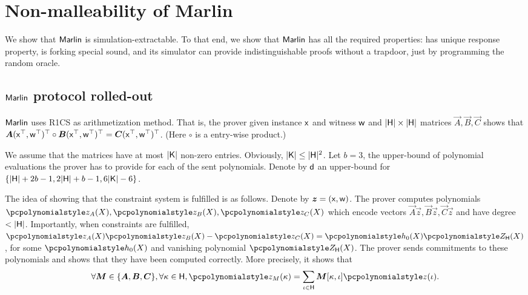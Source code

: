 
\section{Non-malleability of Marlin}
We show that ${\textnormal{\textsf{Marlin}}}$ is simulation-extractable. To that end, we show
that ${\textnormal{\textsf{Marlin}}}$ has all the required properties: has unique response property, is
forking special sound, and its simulator can provide indistinguishable proofs
without a trapdoor, just by programming the random oracle.

\subsection{${\textnormal{\textsf{Marlin}}}$ protocol rolled-out}
${\textnormal{\textsf{Marlin}}}$ uses R1CS as arithmetization method. That is, the prover given
instance $\mathsf{x}$ and witness $\mathsf{w}$ and $|\mathsf{H}| \times |\mathsf{H}|$ matrices $\vec{A},
\vec{B}, \vec{C}$ shows that $\vec{A} (\inp^\top, \wit^\top)^\top \circ \vec{B}
(\inp^\top, \wit^\top)^\top = \vec{C} (\inp^\top, \wit^\top)^\top$. (Here
$\circ$ is a entry-wise product.)

We assume that the matrices have at most $|\mathsf{K}|$ non-zero entries. Obviously,
$|\mathsf{K}| \leq |\mathsf{H}|^2$. Let $b = 3$, the upper-bound of polynomial evaluations
the prover has to provide for each of the sent polynomials.  Denote by $\mathsf{d}$
an upper-bound for $\{|\mathsf{H}| + 2b -1, 2 |\mathsf{H}| + b - 1, 6 |\mathsf{K}| - 6\}$.

The idea of showing that the constraint system is fulfilled is as
follows. Denote by $\vec{z} = (\inp, \wit)$. The prover computes polynomials
$\p{z_A} (X), \p{z_B} (X), \p{z_C} (X)$ which encode vectors
$\vec{A} \vec{z}, \vec{B} \vec{z}, \vec{C} \vec{z}$ and have degree $<
|\mathsf{H}|$. Importantly, when constraints are fulfilled,
$ \p{z_A} (X) \p{z_B} (X) - \p{z_C} (X) = \p{h_0} (X) \ZERO_\HHH (X)$, for some
$\p{h_0} (X)$ and vanishing polynomial $\ZERO_\HHH (X)$. The prover sends
commitments to these polynomials and shows that they have been computed
correctly. More precisely, it shows that
\begin{equation}
  \label{eq:marlin_eq_2}
\forall \vec{M} \in \smallset{\vec{A}, \vec{B}, \vec{C}},  \forall \kappa \in \HHH,
\p{z_M} (\kappa) = \sum_{\iota \in \HHH} \vec{M}[\kappa, \iota] \p{z}(\iota).
\end{equation}

